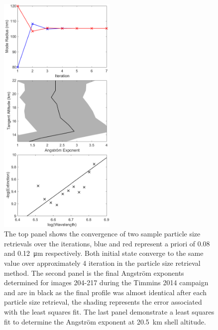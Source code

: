 \begin{figure}
\centering
\includegraphics[width=0.5\textwidth]{./Images/5-4-ParticalSize.pdf}
    \caption[Particle Size Retrieval]{The top panel shows the convergence of two sample particle size retrievals over the iterations, blue and red represent a priori of 0.08 and 0.12~\si{\micro\metre} respectively. Both initial state converge to the same value over approximately 4 iteration in the particle size retrieval method. The second panel is the final Angstr\"{o}m exponents determined for images 204-217 during the Timmins 2014 campaign and are in black as the final profile was almost identical after each particle size retrieval, the shading represents the error associated with the least squares fit. The last panel demonstrate a least squares fit to determine the Angstr\"{o}m exponent at 20.5~km shell altitude.}
    \label{fig:5.4:ParticleSize}
\end{figure}

